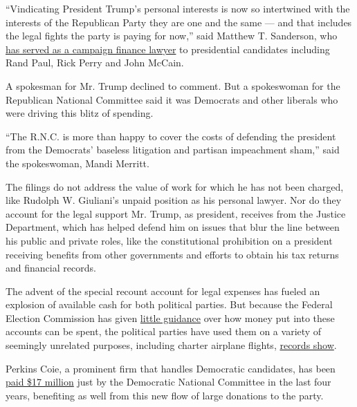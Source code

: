 ``Vindicating President Trump's personal interests is now so intertwined
with the interests of the Republican Party they are one and the same ---
and that includes the legal fights the party is paying for now,'' said
Matthew T. Sanderson, who
\href{https://www.law.virginia.edu/faculty/adjunct-profile/ms9fc/2517710}{has
served as a campaign finance lawyer} to presidential candidates
including Rand Paul, Rick Perry and John McCain.

A spokesman for Mr. Trump declined to comment. But a spokeswoman for the
Republican National Committee said it was Democrats and other liberals
who were driving this blitz of spending.

``The R.N.C. is more than happy to cover the costs of defending the
president from the Democrats' baseless litigation and partisan
impeachment sham,'' said the spokeswoman, Mandi Merritt.

The filings do not address the value of work for which he has not been
charged, like Rudolph W. Giuliani's unpaid position as his personal
lawyer. Nor do they account for the legal support Mr. Trump, as
president, receives from the Justice Department, which has helped defend
him on issues that blur the line between his public and private roles,
like the constitutional prohibition on a president receiving benefits
from other governments and efforts to obtain his tax returns and
financial records.

The advent of the special recount account for legal expenses has fueled
an explosion of available cash for both political parties. But because
the Federal Election Commission has given
\href{https://www.fec.gov/help-candidates-and-committees/registering-political-party/national-party-accounts-certain-expenses/}{little
guidance} over how money put into these accounts can be spent, the
political parties have used them on a variety of seemingly unrelated
purposes, including charter airplane flights,
\href{https://docquery.fec.gov/cgi-bin/fecimg/?201901319144412101}{records
show}.

Perkins Coie, a prominent firm that handles Democratic candidates, has
been
\href{https://www.fec.gov/data/disbursements/?data_type=processed\&committee_id=C00010603\&committee_id=C00571133\&committee_id=C00711069\&recipient_name=PERKINS+COIE\&recipient_name=perkins+coie\&min_date=07\%2F01\%2F2016\&disbursement_description=legal\&disbursement_description=compliance}{paid
\$17 million} just by the Democratic National Committee in the last four
years, benefiting as well from this new flow of large donations to the
party.

